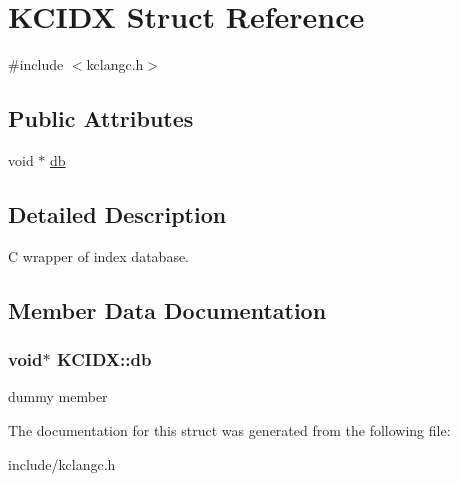 \hypertarget{structKCIDX}{\section{\-K\-C\-I\-D\-X \-Struct \-Reference}
\label{structKCIDX}
}


{\ttfamily \#include $<$kclangc.\-h$>$}

\subsection*{\-Public \-Attributes}
\begin{DoxyCompactItemize}
\item 
void $\ast$ \hyperlink{structKCIDX_aca889f0d26746218f782caa8d6d7b55b}{db}
\end{DoxyCompactItemize}


\subsection{\-Detailed \-Description}
\-C wrapper of index database. 

\subsection{\-Member \-Data \-Documentation}
\hypertarget{structKCIDX_aca889f0d26746218f782caa8d6d7b55b}{
\subsubsection[{db}]{\setlength{\rightskip}{0pt plus 5cm}void$\ast$ {\bf \-K\-C\-I\-D\-X\-::db}}}\label{structKCIDX_aca889f0d26746218f782caa8d6d7b55b}
dummy member 

\-The documentation for this struct was generated from the following file\-:\begin{DoxyCompactItemize}
\item 
include/kclangc.\-h\end{DoxyCompactItemize}
